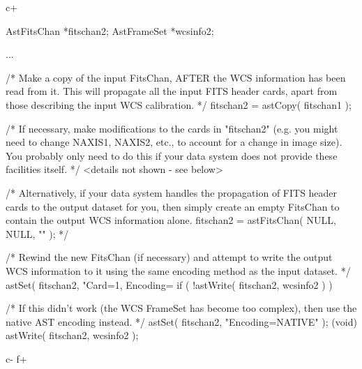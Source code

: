 \documentclass[twoside,11pt]{starlink}
\begin{document}
c+
\small
\begin{terminalv}
AstFitsChan *fitschan2;
AstFrameSet *wcsinfo2;

...

/* Make a copy of the input FitsChan, AFTER the WCS information has
   been read from it. This will propagate all the input FITS header
   cards, apart from those describing the input WCS calibration. */
fitschan2 = astCopy( fitschan1 );

/* If necessary, make modifications to the cards in "fitschan2"
   (e.g. you might need to change NAXIS1, NAXIS2, etc., to account for
   a change in image size). You probably only need to do this if your
   data system does not provide these facilities itself. */
<details not shown - see below>

/* Alternatively, if your data system handles the propagation of FITS
   header cards to the output dataset for you, then simply create an
   empty FitsChan to contain the output WCS information alone.
fitschan2 = astFitsChan( NULL, NULL, "" );
*/

/* Rewind the new FitsChan (if necessary) and attempt to write the
   output WCS information to it using the same encoding method as the
   input dataset. */
astSet( fitschan2, "Card=1, Encoding=%
if ( !astWrite( fitschan2, wcsinfo2 ) ) {

/* If this didn't work (the WCS FrameSet has become too complex), then
   use the native AST encoding instead. */
   astSet( fitschan2, "Encoding=NATIVE" );
   (void) astWrite( fitschan2, wcsinfo2 );
}
\end{terminalv}
\normalsize
c-
f+
\small
\end{document}
